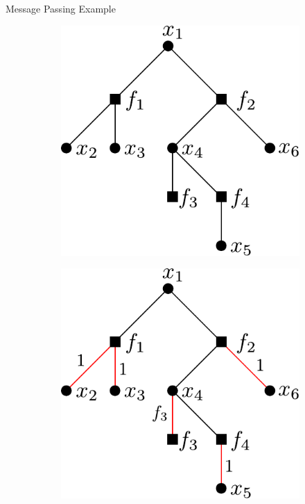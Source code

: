 \documentclass{beamer}
\begin{document}
  \begin{frame}{Message Passing Example}
   \begin{figure}
    \centering
      \begin{subfigure}{0.3\textwidth}
    \includegraphics[scale=0.6]{factor_graph}
  \end{subfigure}
  \hspace{1.5cm}
  \begin{subfigure}{0.3\textwidth}
    \includegraphics[scale=0.6]{factor_graph_step1}
  \end{subfigure}
   \end{figure}

  \end{frame}
\end{document}
